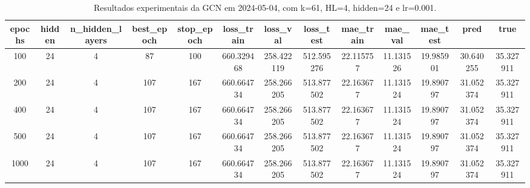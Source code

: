 \begin{table}[h]
\centering
\caption{Resultados experimentais da GCN em 2024-05-04, com k=61, HL=4, hidden=24 e lr=0.001.}
\label{tab:gcn_results_k61_hl4_h24_d20240504}
\begin{tabular}{ccccccccccccc}
\toprule
epochs & hidden & n\_hidden\_layers & best\_epoch & stop\_epoch & loss\_train & loss\_val & loss\_test & mae\_train & mae\_val & mae\_test & pred & true \\
\midrule
100 & 24 & 4 & 87 & 100 & 660.329468 & 258.422119 & 512.595276 & 22.115757 & 11.131526 & 19.985901 & 30.640255 & 35.327911 \\
200 & 24 & 4 & 107 & 167 & 660.664734 & 258.266205 & 513.877502 & 22.163677 & 11.131524 & 19.890797 & 31.052374 & 35.327911 \\
400 & 24 & 4 & 107 & 167 & 660.664734 & 258.266205 & 513.877502 & 22.163677 & 11.131524 & 19.890797 & 31.052374 & 35.327911 \\
500 & 24 & 4 & 107 & 167 & 660.664734 & 258.266205 & 513.877502 & 22.163677 & 11.131524 & 19.890797 & 31.052374 & 35.327911 \\
1000 & 24 & 4 & 107 & 167 & 660.664734 & 258.266205 & 513.877502 & 22.163677 & 11.131524 & 19.890797 & 31.052374 & 35.327911 \\
\bottomrule
\end{tabular}
\end{table}
